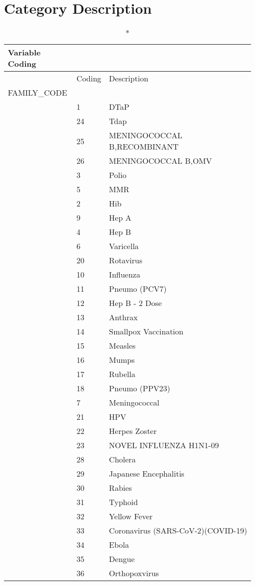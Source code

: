 \documentclass[
  letterpaper,
  DIV=11,
  numbers=noendperiod]{scrreprt}
\begin{document}
\hypertarget{category-description-52}{%
\section*{Category Description}\label{category-description-52}}

\begin{longtable}{l|ll}
\caption*{
{\large Variable Coding}
} \\ 
\toprule
\multicolumn{1}{l}{} & Coding & Description \\ 
\midrule
\multicolumn{3}{l}{FAMILY\_CODE} \\ 
\midrule
  & 1 & DTaP \\ 
  & 24 & Tdap \\ 
  & 25 & MENINGOCOCCAL B,RECOMBINANT \\ 
  & 26 & MENINGOCOCCAL B,OMV \\ 
  & 3 & Polio \\ 
  & 5 & MMR \\ 
  & 2 & Hib \\ 
  & 9 & Hep A \\ 
  & 4 & Hep B \\ 
  & 6 & Varicella \\ 
  & 20 & Rotavirus \\ 
  & 10 & Influenza \\ 
  & 11 & Pneumo (PCV7) \\ 
  & 12 & Hep B - 2 Dose \\ 
  & 13 & Anthrax \\ 
  & 14 & Smallpox Vaccination \\ 
  & 15 & Measles \\ 
  & 16 & Mumps \\ 
  & 17 & Rubella \\ 
  & 18 & Pneumo (PPV23) \\ 
  & 7 & Meningococcal \\ 
  & 21 & HPV \\ 
  & 22 & Herpes Zoster \\ 
  & 23 & NOVEL INFLUENZA H1N1-09 \\ 
  & 28 & Cholera \\ 
  & 29 & Japanese Encephalitis \\ 
  & 30 & Rabies \\ 
  & 31 & Typhoid \\ 
  & 32 & Yellow Fever \\ 
  & 33 & Coronavirus (SARS-CoV-2)(COVID-19) \\ 
  & 34 & Ebola \\ 
  & 35 & Dengue \\ 
  & 36 & Orthopoxvirus \\ 
\bottomrule
\end{longtable}
\end{document}

